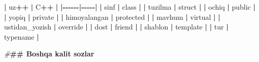 \documentclass[a4paper,11pt,twoside,openright]{book}
\newenvironment{Shaded}{\begin{snugshade}}{\end{snugshade}}
\newcommand{\ErrorTok}[1]{\textcolor[rgb]{0.64,0.00,0.00}{\textbf{#1}}}
\newcommand{\NormalTok}[1]{#1}
\newcommand{\OperatorTok}[1]{\textcolor[rgb]{0.81,0.36,0.00}{\textbf{#1}}}
\newcommand{\PreprocessorTok}[1]{\textcolor[rgb]{0.56,0.35,0.01}{\textit{#1}}}
\begin{document}
\begin{Shaded}
\begin{Highlighting}[]
\OperatorTok{|}\NormalTok{ uz}\OperatorTok{++} \OperatorTok{|}\NormalTok{ C}\OperatorTok{++} \OperatorTok{|}
\OperatorTok{|{-}{-}{-}{-}{-}{-}|{-}{-}{-}{-}{-}|}
\OperatorTok{|} \ErrorTok{\textasciigrave{}}\NormalTok{sinf}\ErrorTok{\textasciigrave{}} \OperatorTok{|} \ErrorTok{\textasciigrave{}}\NormalTok{class}\ErrorTok{\textasciigrave{}} \OperatorTok{|}
\OperatorTok{|} \ErrorTok{\textasciigrave{}}\NormalTok{tuzilma}\ErrorTok{\textasciigrave{}} \OperatorTok{|} \ErrorTok{\textasciigrave{}}\NormalTok{struct}\ErrorTok{\textasciigrave{}} \OperatorTok{|}
\OperatorTok{|} \ErrorTok{\textasciigrave{}}\NormalTok{ochiq}\ErrorTok{\textasciigrave{}} \OperatorTok{|} \ErrorTok{\textasciigrave{}}\NormalTok{public}\ErrorTok{\textasciigrave{}} \OperatorTok{|}
\OperatorTok{|} \ErrorTok{\textasciigrave{}}\NormalTok{yopiq}\ErrorTok{\textasciigrave{}} \OperatorTok{|} \ErrorTok{\textasciigrave{}}\NormalTok{private}\ErrorTok{\textasciigrave{}} \OperatorTok{|}
\OperatorTok{|} \ErrorTok{\textasciigrave{}}\NormalTok{himoyalangan}\ErrorTok{\textasciigrave{}} \OperatorTok{|} \ErrorTok{\textasciigrave{}}\NormalTok{protected}\ErrorTok{\textasciigrave{}} \OperatorTok{|}
\OperatorTok{|} \ErrorTok{\textasciigrave{}}\NormalTok{mavhum}\ErrorTok{\textasciigrave{}} \OperatorTok{|} \ErrorTok{\textasciigrave{}}\NormalTok{virtual}\ErrorTok{\textasciigrave{}} \OperatorTok{|}
\OperatorTok{|} \ErrorTok{\textasciigrave{}}\NormalTok{ustidan\_yozish}\ErrorTok{\textasciigrave{}} \OperatorTok{|} \ErrorTok{\textasciigrave{}}\NormalTok{override}\ErrorTok{\textasciigrave{}} \OperatorTok{|}
\OperatorTok{|} \ErrorTok{\textasciigrave{}}\NormalTok{dost}\ErrorTok{\textasciigrave{}} \OperatorTok{|} \ErrorTok{\textasciigrave{}}\NormalTok{friend}\ErrorTok{\textasciigrave{}} \OperatorTok{|}
\OperatorTok{|} \ErrorTok{\textasciigrave{}}\NormalTok{shablon}\ErrorTok{\textasciigrave{}} \OperatorTok{|} \ErrorTok{\textasciigrave{}}\NormalTok{template}\ErrorTok{\textasciigrave{}} \OperatorTok{|}
\OperatorTok{|} \ErrorTok{\textasciigrave{}}\NormalTok{tur}\ErrorTok{\textasciigrave{}} \OperatorTok{|} \ErrorTok{\textasciigrave{}}\NormalTok{typename}\ErrorTok{\textasciigrave{}} \OperatorTok{|}

\PreprocessorTok{\#}\ErrorTok{\#\# Boshqa kalit so\textquotesingle{}zlar}


\end{Highlighting}
\end{Shaded}
\end{document}
